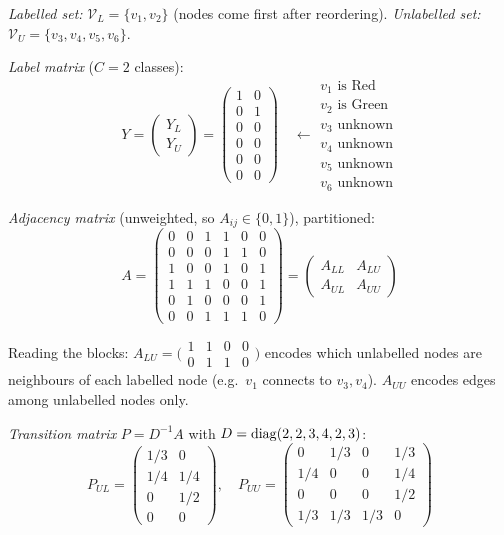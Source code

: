 \begin{notechapter}
\begin{example}
\emph{Labelled set:} $\mathcal{V}_L = \{v_1, v_2\}$ (nodes come first after
reordering). \emph{Unlabelled set:} $\mathcal{V}_U = \{v_3, v_4, v_5, v_6\}$.

\emph{Label matrix} ($C = 2$ classes):
\[
Y = \begin{pmatrix} Y_L \\ \hline Y_U \end{pmatrix}
= \left(\begin{array}{cc} 1 & 0 \\ 0 & 1 \\ \hline 0 & 0 \\ 0 & 0 \\
0 & 0 \\ 0 & 0 \end{array}\right)
\quad \leftarrow \begin{array}{l} v_1 \text{ is Red} \\ v_2 \text{ is Green} \\
v_3 \text{ unknown} \\ v_4 \text{ unknown} \\ v_5 \text{ unknown} \\
v_6 \text{ unknown} \end{array}
\]

\emph{Adjacency matrix} (unweighted, so $A_{ij} \in \{0,1\}$), partitioned:
\[
A = \left(\begin{array}{cc|cccc}
0 & 0 & 1 & 1 & 0 & 0 \\
0 & 0 & 0 & 1 & 1 & 0 \\
\hline
1 & 0 & 0 & 1 & 0 & 1 \\
1 & 1 & 1 & 0 & 0 & 1 \\
0 & 1 & 0 & 0 & 0 & 1 \\
0 & 0 & 1 & 1 & 1 & 0
\end{array}\right)
= \begin{pmatrix} A_{LL} & A_{LU} \\ A_{UL} & A_{UU} \end{pmatrix}
\]

Reading the blocks: $A_{LU} = \bigl(\begin{smallmatrix} 1&1&0&0 \\ 0&1&1&0
\end{smallmatrix}\bigr)$ encodes which unlabelled nodes are neighbours of each
labelled node (e.g.\ $v_1$ connects to $v_3, v_4$). $A_{UU}$ encodes edges
among unlabelled nodes only.

\emph{Transition matrix} $P = D^{-1}A$ with $D = \operatorname{diag}(2, 2, 3, 4, 2, 3)$:
\[
P_{UL} = \begin{pmatrix} 1/3 & 0 \\ 1/4 & 1/4 \\ 0 & 1/2 \\ 0 & 0 \end{pmatrix},
\quad
P_{UU} = \begin{pmatrix} 0 & 1/3 & 0 & 1/3 \\ 1/4 & 0 & 0 & 1/4 \\
0 & 0 & 0 & 1/2 \\ 1/3 & 1/3 & 1/3 & 0 \end{pmatrix}
\]


\end{example}
\end{notechapter}
